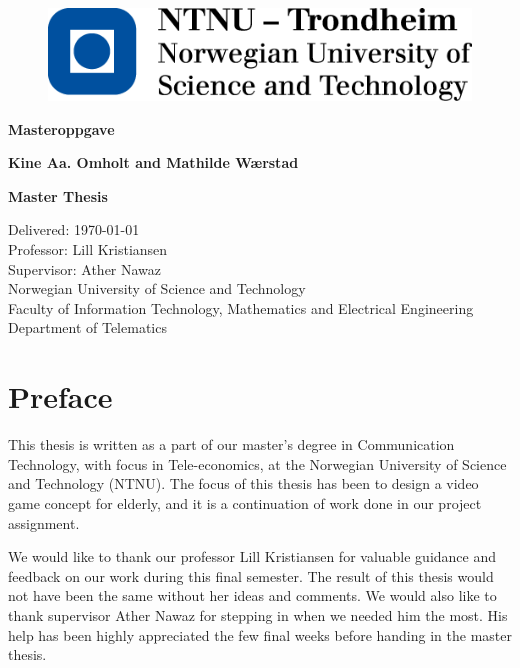 \documentclass[b5paper,twoside,openright,11pt]{report}
\begin{document}
\begin{flushleft}
\begin{figure}[htb]
\includegraphics[scale=0.6]{NTNU-logo}
\end{figure}
\bigskip
\bigskip
\bigskip
\bigskip
\begin{huge}
\textbf{Masteroppgave}\\
\end{huge} 
\bigskip
\bigskip
\bigskip
\bigskip
\bigskip
\bigskip
\bigskip
\begin{Large}
\textbf{Kine Aa. Omholt and Mathilde Wærstad \\}
\end{Large}
\bigskip
\bigskip
\bigskip
\bigskip
\bigskip
\bigskip
\begin{large}
\textbf{Master Thesis\\}
\end{large}
Delivered: \today\\
Professor: Lill Kristiansen\\
Supervisor: Ather Nawaz\\
\bigskip
\bigskip
\bigskip
\bigskip
\bigskip
Norwegian University of Science and Technology\\ 
Faculty of Information Technology, Mathematics and Electrical Engineering\\
Department of Telematics
\end{flushleft}
\cleardoublepage
\begin{abstract}

\end{abstract}
\cleardoublepage
\chapter*{Preface}
This thesis is written as a part of our master's degree in Communication Technology, with focus in Tele-economics, at the Norwegian University of Science and Technology (NTNU). The focus of this thesis has been to design a video game concept for elderly, and it is a continuation of work done in our project assignment. 

We would like to thank our professor Lill Kristiansen for valuable guidance and feedback on our work during this final semester. The result of this thesis would not have been the same without her ideas and comments. We would also like to thank supervisor Ather Nawaz for stepping in when we needed him the most. His help has been highly appreciated the few final weeks before handing in the master thesis.  
\end{document}
